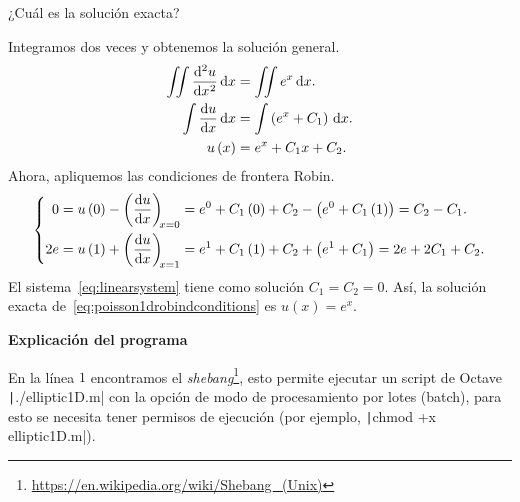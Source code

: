 \begin{problem}
\begin{enumerate}
          ¿Cuál es la solución exacta?

          \begin{solution}
              Integramos dos veces y obtenemos la solución general.
              \begin{align*}
                  \iint
                  \diff[2]{u}{x}
                  \dl x           & =
                  \iint
                  e^{x}
                  \dl x.              \\
                  \int
                  \diff{u}{x}
                  \dl x           & =
                  \int
                  \left(e^{x}+C_{1}\right)
                  \dl x.              \\
                  u\left(x\right) & =
                  e^{x}+C_{1}x+C_{2}.
              \end{align*}
              Ahora, apliquemos las condiciones de frontera Robin.
              \begin{equation}\label{eq:linearsystem}
                  \left\{
                  \begin{aligned}
                      0
                       & =
                      u\left(0\right)-
                      \diff{u}{x}[x=0]=
                      e^{0}+C_{1}\left(0\right)+C_{2}-
                      \left(e^{0}+C_{1}\left(1\right)\right)=
                      C_{2}-C_{1}. \\
                      2e
                       & =
                      u\left(1\right)+
                      \diff{u}{x}[x=1]=
                      e^{1}+C_{1}\left(1\right)+C_{2}+
                      \left(e^{1}+C_{1}\right)=
                      2e+2C_{1}+C_{2}.
                  \end{aligned}
                  \right.
              \end{equation}
              El sistema~\eqref{eq:linearsystem} tiene como solución
              $C_{1}=C_{2}=0$.
              Así, la solución exacta
              de~\eqref{eq:poisson1drobindconditions} es
              $u\left(x\right)=e^{x}$.
          \end{solution}
\end{enumerate}

\textsf{\bfseries Explicación del programa}

En la línea $1$ encontramos el
\emph{shebang}\footnote{\url{https://en.wikipedia.org/wiki/Shebang_(Unix)}},
esto permite ejecutar un script de Octave \texttt|./elliptic1D.m|
con la opción de modo de procesamiento por lotes (batch), para esto
se necesita tener permisos de ejecución (por ejemplo,
\texttt|chmod +x elliptic1D.m|).


\end{problem}
